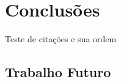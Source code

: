 \chapter{Conclusões}\label{chap:conc}

Teste de citações e sua ordem~\cite{nielsen1994usability,nielsen1994usabilityBook, nielsen1993mathematical}

\lipsum[4-6]

\section{Trabalho Futuro}\label{sec:trab}

\lipsum[1-3]
